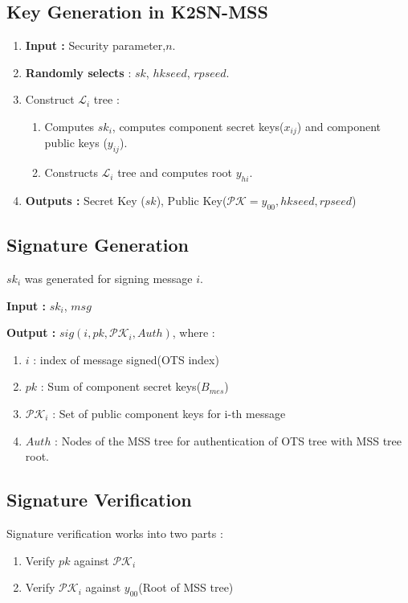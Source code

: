 \subsection{Key Generation in K2SN-MSS}
\begin{enumerate}
    \item \textbf{Input : } Security parameter,$n$.
    \item \textbf{Randomly selects} : $sk$, $hkseed$, $rpseed$.
    \item Construct $\mathcal{L}_{i}$ tree :
        \begin{enumerate}
            \item Computes $sk_{i}$, computes component secret keys($x_{ij}$) and component public keys ($y_{ij}$).
            \item Constructs $\mathcal{L}_{i}$ tree and computes root $y_{hi}$.
        \end{enumerate}
        \item \textbf{Outputs : } Secret Key ($sk$), Public Key($\mathcal{PK} = {y_{00},hkseed, rpseed}$)
\end{enumerate}






\subsection{Signature Generation}
$sk_{i}$ was generated for signing message $i$. 

\textbf{Input : } $sk_{i}$, $msg$

\textbf{Output : } $sig(i,pk,\mathcal{PK}_{i}, Auth)$, where :



\begin{enumerate}
    \item $i$ : index of message signed(OTS index)
    \item $pk$ : Sum of component secret keys($B_{mes}$)
    \item $\mathcal{PK}_{i}$ : Set of public component keys for i-th message
    \item $Auth$ : Nodes of the MSS tree for authentication of OTS tree with MSS tree root.
\end{enumerate}




\subsection{Signature Verification}
Signature verification works into two parts :
\begin{enumerate}
    \item Verify $pk$ against $\mathcal{PK}_{i}$
    \item Verify $\mathcal{PK}_{i}$ against $y_{00}$(Root of MSS tree)
\end{enumerate}

